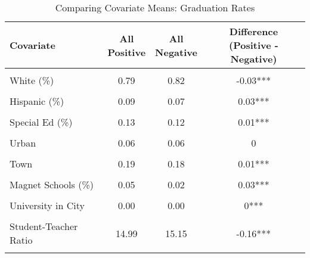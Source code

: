 \begin{table}[!h]
\centering
\caption{\label{tab:cov_means_afgr_all}Comparing Covariate Means: Graduation Rates}
\centering
\begin{tabular}[t]{lccc}
\toprule
Covariate & \makecell[c]{All \\Positive} & \makecell[c]{All \\Negative} & \makecell[c]{Difference\\(Positive - Negative)}\\
\midrule
\cellcolor{gray!10}{Log of Enrollment} & \cellcolor{gray!10}{7.42} & \cellcolor{gray!10}{7.49} & \cellcolor{gray!10}{-0.07***}\\
White (\%) & 0.79 & 0.82 & -0.03***\\
\cellcolor{gray!10}{Black (\%)} & \cellcolor{gray!10}{0.07} & \cellcolor{gray!10}{0.08} & \cellcolor{gray!10}{-0.01***}\\
Hispanic (\%) & 0.09 & 0.07 & 0.03***\\
\cellcolor{gray!10}{Free/Reduced Lunch (\%)} & \cellcolor{gray!10}{0.28} & \cellcolor{gray!10}{0.26} & \cellcolor{gray!10}{0.03***}\\
Special Ed (\%) & 0.13 & 0.12 & 0.01***\\
\cellcolor{gray!10}{Baseline Performance} & \cellcolor{gray!10}{0.81} & \cellcolor{gray!10}{0.80} & \cellcolor{gray!10}{0.01***}\\
Urban & 0.06 & 0.06 & 0\\
\cellcolor{gray!10}{Suburb} & \cellcolor{gray!10}{0.22} & \cellcolor{gray!10}{0.23} & \cellcolor{gray!10}{-0.01**}\\
Town & 0.19 & 0.18 & 0.01***\\
\cellcolor{gray!10}{Rural} & \cellcolor{gray!10}{0.53} & \cellcolor{gray!10}{0.53} & \cellcolor{gray!10}{0}\\
Magnet Schools (\%) & 0.05 & 0.02 & 0.03***\\
\cellcolor{gray!10}{City Population (standardized)} & \cellcolor{gray!10}{0.00} & \cellcolor{gray!10}{0.00} & \cellcolor{gray!10}{0*}\\
University in City & 0.00 & 0.00 & 0***\\
\cellcolor{gray!10}{Per Pupil Revenue} & \cellcolor{gray!10}{9504.96} & \cellcolor{gray!10}{9113.57} & \cellcolor{gray!10}{391.38***}\\
Student-Teacher Ratio & 14.99 & 15.15 & -0.16***\\
\cellcolor{gray!10}{Teacher Salary} & \cellcolor{gray!10}{72519.19} & \cellcolor{gray!10}{71398.15} & \cellcolor{gray!10}{1121.04***}\\

\end{tabular}
\end{table}
